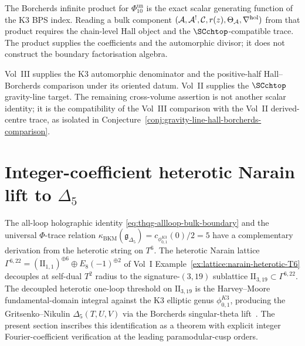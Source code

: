 \begin{remark}
\label{rem:thqg-borcherds-is-holographic-atom}
The Borcherds infinite product for $\Phi_{10}^{\mathrm{un}}$ is the exact scalar
generating function of the K3 BPS index. Reading a bulk component
$(\mathcal{A},\mathcal{A}^!,\mathcal{C},r(z),\Theta_{\mathcal{A}},\nabla^{\mathrm{hol}})$ from that
product requires the chain-level Hall object and the
$\SCchtop$-compatible trace. The product supplies the coefficients
and the automorphic divisor; it does not construct the boundary
factorisation algebra.
\end{remark}

\begin{remark}
\label{rem:thqg-allloop-cross-volume}
Vol~III supplies the K3 automorphic denominator and the
positive-half Hall--Borcherds comparison under its oriented datum.
Vol~II supplies the $\SCchtop$ gravity-line target. The remaining
cross-volume assertion is not another scalar identity; it is the
compatibility of the Vol~III comparison with the Vol~II derived-centre
trace, as isolated in
Conjecture~\ref{conj:gravity-line-hall-borcherds-comparison}.
\end{remark}

\section{Integer-coefficient heterotic Narain lift to $\Delta_5$}
\label{sec:thqg-heterotic-lift-integers}

The all-loop holographic identity
\eqref{eq:thqg-allloop-bulk-boundary} and the universal
$\Phi$-trace relation
$\kappa_{\mathrm{BKM}}(\mathfrak{g}_{\Delta_5})
=c_{\phi_{0,1}^{K3}}(0)/2=5$ have a
complementary derivation from the heterotic string on $T^6$. The
heterotic Narain lattice $\Gamma^{6,22} = (\mathrm{II}_{1,1})^{\oplus 6}
\oplus E_8(-1)^{\oplus 2}$ of Vol~I
Example~\ref{ex:lattice:narain-heterotic-T6} decouples at self-dual
$T^2$ radius to the signature-$(3,19)$ sublattice
$\mathrm{II}_{3,19}\subset\Gamma^{6,22}$. The decoupled heterotic
one-loop threshold on $\mathrm{II}_{3,19}$ is the
Harvey--Moore~\cite[\S 6]{HarveyMoore1996} fundamental-domain
integral against the K3 elliptic genus $\phi_{0,1}^{K3}$, producing
the Gritsenko--Nikulin $\Delta_5(T, U, V)$ via the Borcherds
singular-theta lift~\cite[Theorem~13.3]{Borcherds1998}. The present
section inscribes this identification as a theorem with explicit
integer Fourier-coefficient verification at the leading
paramodular-cusp orders.

